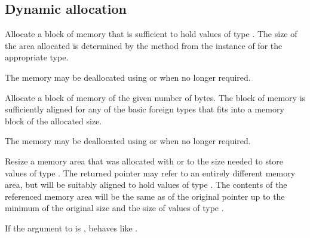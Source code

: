 \subsection{Dynamic allocation}
\begin{haddockdesc}
\item[\begin{tabular}{@{}l}
malloc :: Storable a => IO (Ptr a)
\end{tabular}]
{\haddockbegindoc
Allocate a block of memory that is sufficient to hold values of type
 .  The size of the area allocated is determined by the 
 method from the instance of  for the appropriate type.\par
The memory may be deallocated using  or  when
 no longer required.\par}
\end{haddockdesc}
\begin{haddockdesc}
\item[\begin{tabular}{@{}l}
mallocBytes :: Int -> IO (Ptr a)
\end{tabular}]
{\haddockbegindoc
Allocate a block of memory of the given number of bytes.
 The block of memory is sufficiently aligned for any of the basic
 foreign types that fits into a memory block of the allocated size.\par
The memory may be deallocated using  or  when
 no longer required.\par}
\end{haddockdesc}
\begin{haddockdesc}
\item[\begin{tabular}{@{}l}
realloc :: forall a b. Storable b => Ptr a -> IO (Ptr b)
\end{tabular}]
{\haddockbegindoc
Resize a memory area that was allocated with  or 
 to the size needed to store values of type .  The returned pointer
 may refer to an entirely different memory area, but will be suitably
 aligned to hold values of type .  The contents of the referenced
 memory area will be the same as of the original pointer up to the
 minimum of the original size and the size of values of type .\par
If the argument to  is ,  behaves like
 .\par}
\end{haddockdesc}
